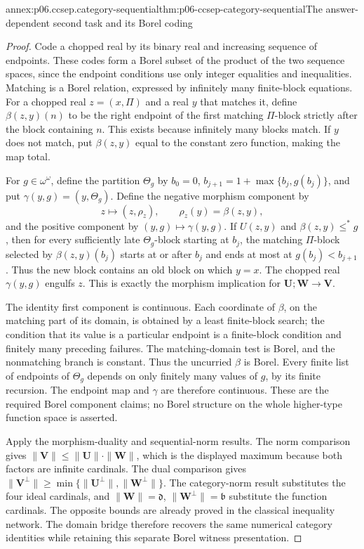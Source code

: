 \begin{annexitem}{annex:p06.ccsep.category-sequential}{thm:p06-ccsep-category-sequential}{The answer-dependent second task and its Borel coding}
\begin{proof}
Code a chopped real by its binary real and increasing sequence of
endpoints. These codes form a Borel subset of the product of the
two sequence spaces, since the endpoint conditions use only integer
equalities and inequalities. Matching is a Borel relation, expressed
by infinitely many finite-block equations. For a chopped real
\(z=(x,\Pi)\) and a real \(y\) that matches it, define
\(\beta(z,y)(n)\) to be the right endpoint of the first matching
\(\Pi\)-block strictly after the block containing \(n\). This exists
because infinitely many blocks match. If \(y\) does not match,
put \(\beta(z,y)\) equal to the constant zero function, making
the map total.

For \(g\in\omega^\omega\), define the partition \(\Theta_g\)
by \(b_0=0\),
\(b_{j+1}=1+\max\{b_j,g(b_j)\}\), and put
\(\gamma(y,g)=(y,\Theta_g)\). Define the negative morphism
component by
\[
 z\longmapsto(z,\rho_z),\qquad \rho_z(y)=\beta(z,y),
\]
and the positive component by \((y,g)\mapsto\gamma(y,g)\).
If \(U(z,y)\) and \(\beta(z,y)\leq^*g\), then for every
sufficiently late \(\Theta_g\)-block starting at \(b_j\), the
matching \(\Pi\)-block selected by \(\beta(z,y)(b_j)\) starts
at or after \(b_j\) and ends at most at
\(g(b_j)<b_{j+1}\). Thus the new block contains an old block
on which \(y=x\). The chopped real \(\gamma(y,g)\) engulfs
\(z\). This is exactly the morphism implication for \(\mathbf U;\mathbf W\to\mathbf V\).

The identity first component is continuous. Each coordinate of
\(\beta\), on the matching part of its domain, is obtained by
a least finite-block search; the condition that its value is a
particular endpoint is a finite-block condition and finitely many
preceding failures. The matching-domain test is Borel, and the
nonmatching branch is constant. Thus the uncurried \(\beta\) is
Borel. Every finite list of endpoints of \(\Theta_g\) depends
on only finitely many values of \(g\), by its finite recursion.
The endpoint map and \(\gamma\) are therefore continuous.
These are the required Borel component claims; no Borel structure
on the whole higher-type function space is asserted.

Apply the morphism-duality and sequential-norm results. The norm
comparison gives
\(\|\mathbf V\|\leq\|\mathbf U\|\cdot\|\mathbf W\|\), which is the displayed
maximum because both factors are infinite cardinals. The dual
comparison gives
\(\|\mathbf V^\perp\|\geq\min\{\|\mathbf U^\perp\|,\|\mathbf W^\perp\|\}\).
The category-norm result substitutes the four ideal cardinals,
and \(\|\mathbf W\|=\mathfrak d\), \(\|\mathbf W^\perp\|=\mathfrak b\)
substitute the function cardinals. The opposite bounds are already
proved in the classical inequality network. The domain bridge
therefore recovers the same numerical category identities while
retaining this separate Borel witness presentation.
\end{proof}
\end{annexitem}

